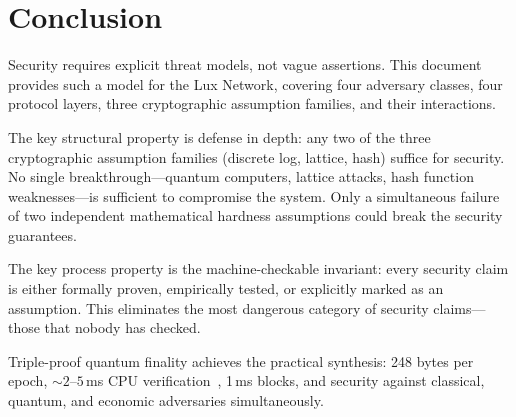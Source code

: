 \section{Conclusion}


Security requires explicit threat models, not vague assertions. This document
provides such a model for the Lux Network, covering four adversary classes, four
protocol layers, three cryptographic assumption families, and their interactions.

The key structural property is defense in depth: any two of the three cryptographic
assumption families (discrete log, lattice, hash) suffice for security. No single
breakthrough---quantum computers, lattice attacks, hash function weaknesses---is
sufficient to compromise the system. Only a simultaneous failure of two independent
mathematical hardness assumptions could break the security guarantees.

The key process property is the machine-checkable invariant: every security claim is
either formally proven, empirically tested, or explicitly marked as an assumption.
This eliminates the most dangerous category of security claims---those that nobody
has checked.

Triple-proof quantum finality achieves the practical synthesis: 248 bytes per epoch,
${\sim}2$--$5$\,ms CPU verification~\cite{lux-benchmarks}, 1\,ms blocks, and security
against classical, quantum, and economic adversaries simultaneously.

